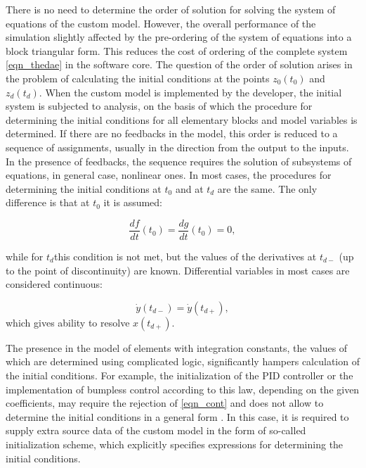 \documentclass[lettersize,journal]{IEEEtran}
\begin{document}
There is no need to determine the order of solution for solving the system of equations of the custom model.
However, the overall performance of the simulation slightly affected by the pre-ordering of the system of
equations into a block triangular form. This reduces the cost of ordering of the complete system 
\eqref{eqn_thedae} in the software core. The question of the order of solution arises in the problem of
calculating the initial conditions at the points \(z_0 (t_0)\) and \(z_d (t_d)\). When the custom model is
implemented by the developer, the initial system is subjected to analysis, on the basis of which the 
procedure for determining the initial conditions for all elementary blocks and model variables is determined. 
If there are no feedbacks in the model, this order is reduced to a sequence of assignments, usually in the
direction from the output to the inputs. In the presence of feedbacks, the sequence requires the solution of
subsystems of equations, in general case, nonlinear ones. In most cases, the procedures for determining the
initial conditions at \(t_0\) and at \(t_d\) are the same. The only difference is that at \(t_0\) it is assumed:

\begin{equation}
	\label{eqn_opthree}
	\frac{df}{dt}(t_0)=\frac{dg}{dt}(t_0)=0,
\end{equation}

\noindent while for \(t_d \)this condition is not met, but the values of the derivatives at 
\(t_{d-}\) (up to the point of discontinuity) are known. Differential variables in most cases are considered continuous:

\begin{equation}
	\label{eqn_cont}
	\dot{y}(t_{d-})=\dot{y}(t_{d+}),
\end{equation}
\noindent which gives ability to resolve \(x(t_{d+})\).

The presence in the model of elements with integration constants, the values of which are determined using complicated logic,
significantly hampers calculation of the initial conditions. For example, the initialization of the PID controller or the
implementation of bumpless control according to this law, depending on the given coefficients, may require the rejection of 
\eqref{eqn_cont} and does not allow to determine the initial conditions in a general form \cite{fabozzi17}. In this case, 
it is required to supply extra source data of the custom model in the form of so-called initialization scheme, which explicitly
specifies expressions for determining the initial conditions.
\end{document}
